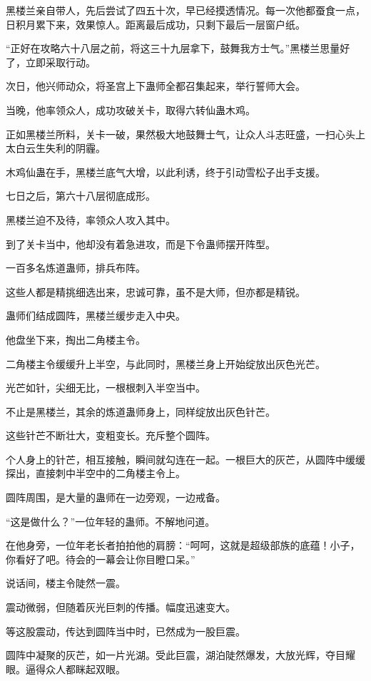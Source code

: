 \begin{this_body}
黑楼兰亲自带人，先后尝试了四五十次，早已经摸透情况。每一次他都蚕食一点，日积月累下来，效果惊人。距离最后成功，只剩下最后一层窗户纸。

“正好在攻略六十八层之前，将这三十九层拿下，鼓舞我方士气。”黑楼兰思量好了，立即采取行动。

次日，他兴师动众，将圣宫上下蛊师全都召集起来，举行誓师大会。

当晚，他率领众人，成功攻破关卡，取得六转仙蛊木鸡。

正如黑楼兰所料，关卡一破，果然极大地鼓舞士气，让众人斗志旺盛，一扫心头上太白云生失利的阴霾。

木鸡仙蛊在手，黑楼兰底气大增，以此利诱，终于引动雪松子出手支援。

七日之后，第六十八层彻底成形。

黑楼兰迫不及待，率领众人攻入其中。

到了关卡当中，他却没有着急进攻，而是下令蛊师摆开阵型。

一百多名炼道蛊师，排兵布阵。

这些人都是精挑细选出来，忠诚可靠，虽不是大师，但亦都是精锐。

蛊师们结成圆阵，黑楼兰缓步走入中央。

他盘坐下来，掏出二角楼主令。

二角楼主令缓缓升上半空，与此同时，黑楼兰身上开始绽放出灰色光芒。

光芒如针，尖细无比，一根根刺入半空当中。

不止是黑楼兰，其余的炼道蛊师身上，同样绽放出灰色针芒。

这些针芒不断壮大，变粗变长。充斥整个圆阵。

个人身上的针芒，相互接触，瞬间就勾连在一起。一根巨大的灰芒，从圆阵中缓缓探出，直接刺中半空中的二角楼主令上。

圆阵周围，是大量的蛊师在一边旁观，一边戒备。

“这是做什么？”一位年轻的蛊师。不解地问道。

在他身旁，一位年老长者拍拍他的肩膀：“呵呵，这就是超级部族的底蕴！小子，你看好了吧。待会的一幕会让你目瞪口呆。”

说话间，楼主令陡然一震。

震动微弱，但随着灰光巨刺的传播。幅度迅速变大。

等这股震动，传达到圆阵当中时，已然成为一股巨震。

圆阵中凝聚的灰芒，如一片光湖。受此巨震，湖泊陡然爆发，大放光辉，夺目耀眼。逼得众人都眯起双眼。


\end{this_body}
